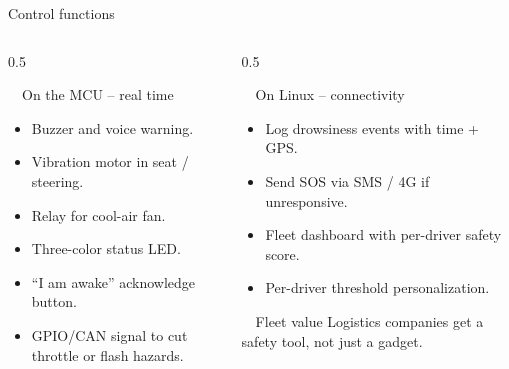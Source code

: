 \documentclass[aspectratio=169, 10pt]{beamer}
\begin{document}
\begin{frame}{Control functions}
  \begin{columns}[T]
    \begin{column}{0.5\textwidth}
      \begin{card}{\faMicrochip~~On the MCU -- real time}
        \scriptsize
        \begin{itemize}
          \item Buzzer and voice warning.
          \item Vibration motor in seat / steering.
          \item Relay for cool-air fan.
          \item Three-color status LED.
          \item ``I am awake'' acknowledge button.
          \item GPIO/CAN signal to cut throttle or flash hazards.
        \end{itemize}
      \end{card}
    \end{column}
    \begin{column}{0.5\textwidth}
      \begin{goldcard}{\faSatelliteDish~~On Linux -- connectivity}
        \scriptsize
        \begin{itemize}
          \item Log drowsiness events with time + GPS.
          \item Send SOS via SMS / 4G if unresponsive.
          \item Fleet dashboard with per-driver safety score.
          \item Per-driver threshold personalization.
        \end{itemize}
      \end{goldcard}
      \vspace{0.4em}
      \begin{alertcard}{\faUsers~~Fleet value}
        \scriptsize Logistics companies get a safety tool, not just a gadget.
      \end{alertcard}
    \end{column}
  \end{columns}
\end{frame}
\end{document}
